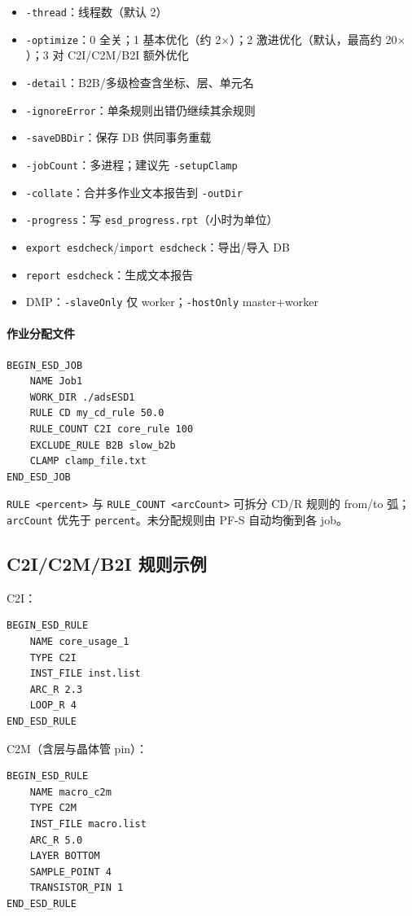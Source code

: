 \begin{itemize}
  \item \texttt{-thread}：线程数（默认 2）
  \item \texttt{-optimize}：0 全关；1 基本优化（约 2$\times$）；2 激进优化（默认，最高约 20$\times$）；3 对 C2I/C2M/B2I 额外优化
  \item \texttt{-detail}：B2B/多级检查含坐标、层、单元名
  \item \texttt{-ignoreError}：单条规则出错仍继续其余规则
  \item \texttt{-saveDBDir}：保存 DB 供同事务重载
  \item \texttt{-jobCount}：多进程；建议先 \texttt{-setupClamp}
  \item \texttt{-collate}：合并多作业文本报告到 \texttt{-outDir}
  \item \texttt{-progress}：写 \texttt{esd\_progress.rpt}（小时为单位）
  \item \texttt{export esdcheck}/\texttt{import esdcheck}：导出/导入 DB
  \item \texttt{report esdcheck}：生成文本报告
  \item DMP：\texttt{-slaveOnly} 仅 worker；\texttt{-hostOnly} master+worker
\end{itemize}

\paragraph{作业分配文件}
\begin{lstlisting}
BEGIN_ESD_JOB
    NAME Job1
    WORK_DIR ./adsESD1
    RULE CD my_cd_rule 50.0
    RULE_COUNT C2I core_rule 100
    EXCLUDE_RULE B2B slow_b2b
    CLAMP clamp_file.txt
END_ESD_JOB
\end{lstlisting}
\texttt{RULE <percent>} 与 \texttt{RULE_COUNT <arcCount>} 可拆分 CD/R 规则的 from/to 弧；\texttt{arcCount} 优先于 \texttt{percent}。未分配规则由 PF-S 自动均衡到各 job。

\subsection{C2I/C2M/B2I 规则示例}
C2I：
\begin{lstlisting}
BEGIN_ESD_RULE
    NAME core_usage_1
    TYPE C2I
    INST_FILE inst.list
    ARC_R 2.3
    LOOP_R 4
END_ESD_RULE
\end{lstlisting}

C2M（含层与晶体管 pin）：
\begin{lstlisting}
BEGIN_ESD_RULE
    NAME macro_c2m
    TYPE C2M
    INST_FILE macro.list
    ARC_R 5.0
    LAYER BOTTOM
    SAMPLE_POINT 4
    TRANSISTOR_PIN 1
END_ESD_RULE
\end{lstlisting}

